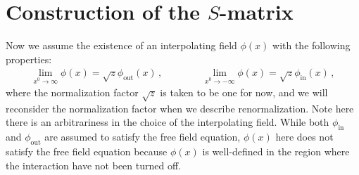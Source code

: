 \documentclass[11pt, onesided]{book}
\theoremstyle{break}
\theoremstyle{break}
\begin{document}
\section[Construction of the $S$-matrix]{\color{red}Construction of the $S$-matrix\color{black}}
Now we assume the existence of an interpolating field $\phi(x)$ with the following properties:
\begin{align*}
\lim_{x^0\to \infty}\phi(x) = \sqrt{z} \phi_{\text{out}}(x)\,,\qquad\qquad
\lim_{x^0\to -\infty}\phi(x) = \sqrt{z} \phi_{\text{in}}(x)\,,
\end{align*}
where the normalization factor $\sqrt{z}$ is taken to be one for now, and we will reconsider the normalization factor when we describe renormalization. Note here there is an arbitrariness in the choice of the interpolating field. While both $\phi_{\text{in}}$ and $\phi_{\text{out}}$ are assumed to satisfy the free field equation, $\phi(x)$ here does not satisfy the free field equation because $\phi(x)$ is well-defined in the region where the interaction have not been turned off. \\
\end{document}
